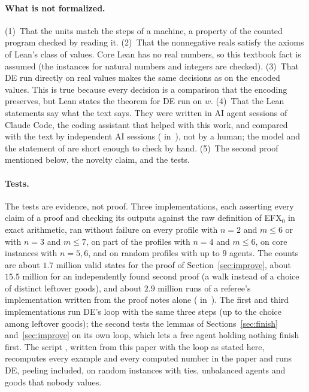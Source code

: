 \documentclass[runningheads,11pt]{llncs}
\newcommand{\efxz}{\texorpdfstring{\mbox{EFX$_0$}}{EFX0}}
\newcommand{\DE}{\textup{DE}}
\begin{document}
\paragraph{What is not formalized.} (1)~That the units match the steps of a machine, a property of the counted program checked by reading it. (2)~That the nonnegative reals satisfy the axioms of Lean's class of values. Core Lean has no real numbers, so this textbook fact is assumed (the instances for natural numbers and integers are checked). (3)~That \DE{} run directly on real values makes the same decisions as on the encoded values. This is true because every decision is a comparison that the encoding preserves, but Lean states the theorem for \DE{} run on $w$. (4)~That the Lean statements say what the text says. They were written in AI agent sessions of Claude Code, the coding assistant that helped with this work, and compared with the text by independent AI sessions ( in~\cite{Repo}), not by a human; the model and the statement of  are short enough to check by hand. (5)~The second proof mentioned below, the novelty claim, and the tests.

\paragraph{Tests.} The tests are evidence, not proof. Three implementations, each asserting every claim of a proof and checking its outputs against the raw definition of \efxz{} in exact arithmetic, ran without failure on every profile with $n=2$ and $m\le6$ or with $n=3$ and $m\le7$, on part of the profiles with $n=4$ and $m\le6$, on core instances with $n=5,6$, and on random profiles with up to $9$ agents. The counts are about $1.7$ million valid states for the proof of Section~\ref{sec:improve}, about $15.5$ million for an independently found second proof (a walk instead of a choice of distinct leftover goods), and about $2.9$ million runs of a referee's implementation written from the proof notes alone ( in~\cite{Repo}). The first and third implementations run \DE{}'s loop with the same three steps (up to the choice among leftover goods); the second tests the lemmas of Sections~\ref{sec:finish} and~\ref{sec:improve} on its own loop, which lets a free agent holding nothing finish first. The script , written from this paper with the loop as stated here, recomputes every example and every computed number in the paper and runs \DE{}, peeling included, on random instances with ties, unbalanced agents and goods that nobody values.
\end{document}
